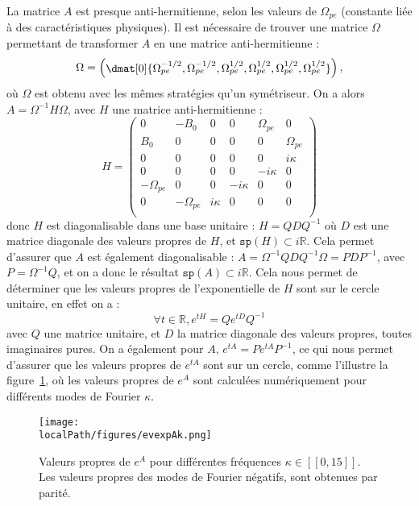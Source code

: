 La matrice $A$ est presque anti-hermitienne, selon les valeurs de $\Omega_{pe}$ (constante liée à des caractéristiques physiques).  Il est nécessaire de trouver une matrice $\Omega$ permettant de transformer $A$ en une matrice anti-hermitienne :
$$
  \Omega = 
  \begin{pmatrix}
    \dmat[0]{\Omega_{pe}^{-1/2},\Omega_{pe}^{-1/2},\Omega_{pe}^{1/2},\Omega_{pe}^{1/2},\Omega_{pe}^{1/2},\Omega_{pe}^{1/2}}
  \end{pmatrix},
$$
où $\Omega$ est obtenu avec les mêmes stratégies qu'un symétriseur. On a alors $A = \Omega^{-1}H\Omega$, avec $H$ une matrice anti-hermitienne :
$$
  H = \begin{pmatrix}
    0           & -B_0         & 0       &  0       &  \Omega_{pe}  & 0           \\
    B_0         &  0           & 0       &  0       &  0            & \Omega_{pe} \\
    0           &  0           & 0       &  0       &  0            & i\kappa     \\
    0           &  0           & 0       &  0       & -i\kappa      & 0           \\
   -\Omega_{pe} &  0           & 0       & -i\kappa &  0            & 0           \\
    0           & -\Omega_{pe} & i\kappa &  0       &  0            & 0           \\
  \end{pmatrix}
$$
donc $H$ est diagonalisable dans une base unitaire : $H = QDQ^{-1}$ où $D$ est une matrice diagonale des valeurs propres de $H$, et $\texttt{sp}(H)\subset i\mathbb{R}$. Cela permet d'assurer que $A$ est également diagonalisable : $A = \Omega^{-1}QDQ^{-1}\Omega = PDP^{-1}$, avec $P=\Omega^{-1}Q$, et on a donc le résultat $\texttt{sp}(A)\subset i\mathbb{R}$. Cela nous permet de déterminer que les valeurs propres de l'exponentielle de $H$ sont sur le cercle unitaire, en effet on a :
$$
  \forall t\in\mathbb{R}, e^{tH} = Qe^{tD}Q^{-1}
$$
avec $Q$ une matrice unitaire, et $D$ la matrice diagonale des valeurs propres, toutes imaginaires pures. On a également pour $A$, $e^{tA}=Pe^{tA}P^{-1}$, ce qui nous permet d'assurer que les valeurs propres de $e^{tA}$ sont sur un cercle, comme l'illustre la figure~\ref{fig:evexpAk}, où les valeurs propres de $e^{A}$ sont calculées numériquement pour différents modes de Fourier $\kappa$.

\begin{figure}
  \centering
  \texttt{[image: \\localPath/figures/evexpAk.png]}
  \caption{Valeurs propres de $e^{A}$ pour différentes fréquences $\kappa\in[\![0,15]\!]$. Les valeurs propres des modes de Fourier négatifs, sont obtenues par parité.}
  \label{fig:evexpAk}
\end{figure}

